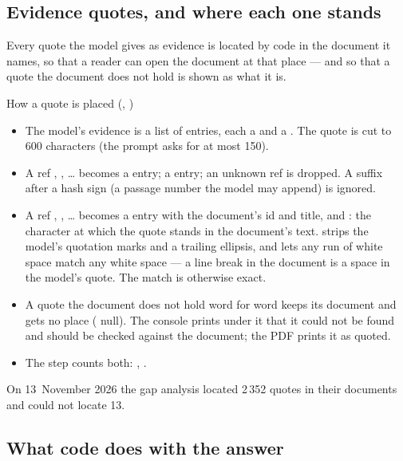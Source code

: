 \subsection{Evidence quotes, and where each one stands}

Every quote the model gives as evidence is located by code in the document it names, so that a
reader can open the document at that place --- and so that a quote the document does not hold
is shown as what it is.

\begin{codebox}{How a quote is placed (, )}
\begin{itemize}
  \item The model's evidence is a list of entries, each a  and a . The quote is cut to 600
    characters (the prompt asks for at most 150).
  \item A ref , , \ldots{} becomes a  entry;  a
     entry; an unknown ref is dropped. A suffix after a hash sign (a passage
    number the model may append) is ignored.
  \item A ref , , \ldots{} becomes a  entry with the document's
    id and title, and : the character at which the quote stands in the document's
    text.  strips the model's quotation marks and a trailing ellipsis, and
    lets any run of white space match any white space --- a line break in the document is a
    space in the model's quote. The match is otherwise exact.
  \item A quote the document does not hold word for word keeps its document and gets no place
    ( null). The console prints under it that it could not be found and should be
    checked against the document; the PDF prints it as quoted.
  \item The step counts both: , .
\end{itemize}
\end{codebox}

On 13~November 2026 the gap analysis located 2\,352 quotes in their documents and could not
locate 13.

\subsection{What code does with the answer}

